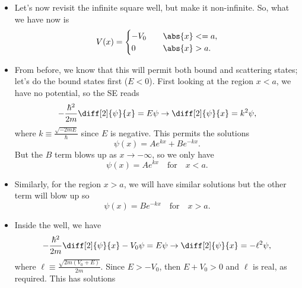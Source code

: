 \begin{itemize}
    \item Let's now revisit the infinite square well, but make it non-infinite. So, what we have now is
        \begin{equation}
            V(x) = 
                \begin{alignedat}{1}
                \begin{cases}
                    -V_0 \quad &\abs{x} <= a, \\
                    0 \quad &\abs{x} > a.
                \end{cases}
                \end{alignedat}
        \end{equation}
    \item From before, we know that this will permit both bound and scattering states; let's do the bound states first ($E<0$). First looking at the region $x < a$, we have no potential, so the SE reads
        \begin{equation*}
            -\frac{\hbar^2}{2m}\diff[2]{\psi}{x} = E\psi \rightarrow \diff[2]{\psi}{x} = k^2\psi,
        \end{equation*}
        where $k \equiv \frac{\sqrt{-2mE}}{\hbar}$ since $E$ is negative. This permits the solutions
        \begin{equation*}
            \psi(x) = Ae^{kx} + Be^{-kx}.
        \end{equation*}
        But the $B$ term blows up as $x \rightarrow -\infty$, so we only have 
        \begin{equation}
            \psi(x) = Ae^{kx} \quad \mathrm{for} \quad x<a.
        \end{equation}
    \item Similarly, for the region $x>a$, we will have similar solutions but the other term will blow up so
        \begin{equation}
            \psi(x) = Be^{-kx} \quad \mathrm{for} \quad x>a.
        \end{equation}
    \item Inside the well, we have
        \begin{equation*}
            -\frac{\hbar^2}{2m}\diff[2]{\psi}{x} -V_0\psi = E\psi \rightarrow \diff[2]{\psi}{x} = -\ell^2\psi,
        \end{equation*}
        where $\ell \equiv \frac{\sqrt{2m(V_0 + E)}}{2m}$. Since $E > -V_0$, then $E+V_0>0$ and $\ell$ is real, as required. This has solutions
        \begin{equation}

\end{equation}
\end{itemize}
